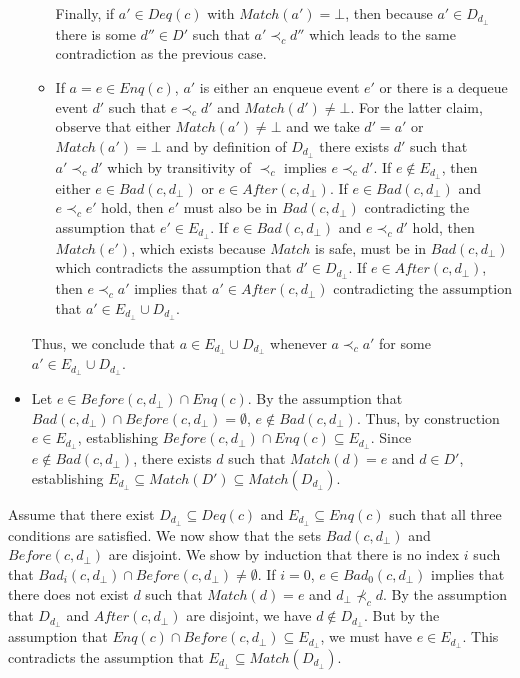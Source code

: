 \documentclass{LMCS}
\newcommand{\Match}{\ensuremath{\mathit{Match}}}
\newcommand{\Deq}[1]{\ensuremath{\mathit{Deq}({#1})}}
\newcommand{\Enq}[1]{\ensuremath{\mathit{Enq}({#1})}}
\newcommand{\Before}[2]{\ensuremath{\mathit{Before}({#1},{#2})}}
\newcommand{\After}[2]{\ensuremath{\mathit{After}({#1},{#2})}}
\newcommand{\Bad}[2]{\ensuremath{\mathit{Bad}(#1,#2)}}
\newcommand{\Badx}[3]{\ensuremath{\mathit{Bad}_{#3}(#1,#2)}}
\newcommand{\dhat}{\ensuremath{d_{\bot}}}
\newcommand{\Dhat}{\ensuremath{D_{\dhat}}}
\newcommand{\Ehat}{\ensuremath{E_{\dhat}}}
\begin{document}
\begin{itemize}
\begin{itemize}
Finally, if $a'\in \Deq c$ with $\Match(a')=\bot$, then because $a'\in \Dhat$ there is some $d''\in D'$ such that $a'\prec_c d''$ which leads to the same contradiction as the previous case.
\item If $a=e\in \Enq c$, $a'$ is either an enqueue event $e'$ or there is a dequeue event $d'$ such that $e\prec_c d'$ and $\Match(d')\neq \bot$.
For the latter claim, observe that either $\Match(a')\neq\bot$ and we take $d'=a'$ or $\Match(a')=\bot$ and by definition of $\Dhat$ there exists $d'$ such that $a'\prec_c d'$ which by transitivity of $\prec_c$ implies $e\prec_c d'$.
If $e\notin \Ehat$, then either $e\in \Bad c \dhat$ or $e\in \After c \dhat$.
If $e\in \Bad c \dhat$ and $e\prec_c e'$ hold, then $e'$ must also be in $\Bad c \dhat$ contradicting the assumption that $e'\in \Ehat$.
If $e\in \Bad c \dhat$ and $e\prec_c d'$ hold, then $\Match(e')$, which exists because $\Match$ is safe, must be in $\Bad c \dhat$ which contradicts the assumption that $d'\in \Dhat$.
If $e\in \After c \dhat$, then $e\prec_c a'$ implies that $a'\in \After c \dhat$ contradicting the assumption that $a'\in \Ehat\cup \Dhat$.
\end{itemize}
Thus, we conclude that $a\in \Ehat\cup \Dhat$ whenever $a\prec_c a'$ for some $a'\in \Ehat\cup \Dhat$.
\item Let $e\in \Before c \dhat \cap \Enq c$.
By the assumption that $\Bad c \dhat \cap \Before c \dhat = \emptyset$, $e\notin \Bad c \dhat$.
Thus, by construction  $e\in \Ehat$, establishing $\Before c \dhat \cap \Enq c\subseteq \Ehat$.
Since $e\notin \Bad c \dhat$, there exists $d$ such that $\Match(d)=e$ and $d\in D'$, establishing $\Ehat \subseteq \Match(D')\subseteq \Match(\Dhat)$.
\end{itemize}

\noindent{\bf ($\Leftarrow$)}
Assume that there exist $\Dhat\subseteq \Deq c$ and $\Ehat\subseteq \Enq c$ such that all three conditions are satisfied.
We now show that the sets $\Bad c \dhat$ and $\Before c \dhat$ are disjoint.
We show by induction that there is no index $i$ such that $\Badx c {\dhat} i \cap \Before c \dhat\neq \emptyset$.
If $i=0$,  $e\in \Badx c {\dhat} 0$ implies that there does not exist $d$ such that $\Match(d)=e$ and $d_{\bot}\not\prec_c d$.
By the assumption that $\Dhat$ and $\After c \dhat$ are disjoint, we have $d\notin \Dhat$.
But by the assumption that $\Enq c \cap \Before c \dhat \subseteq \Ehat$, we must have $e\in \Ehat$.
This contradicts the assumption that $\Ehat \subseteq \Match(\Dhat)$.
\end{document}
